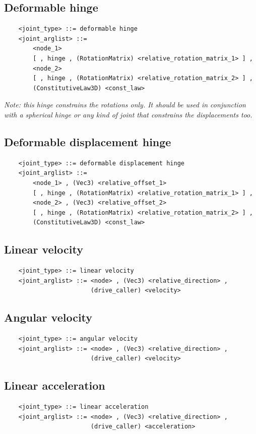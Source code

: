 \subsection{Deformable hinge}
\begin{verbatim}
    <joint_type> ::= deformable hinge
    <joint_arglist> ::= 
        <node_1>
        [ , hinge , (RotationMatrix) <relative_rotation_matrix_1> ] ,
        <node_2> 
        [ , hinge , (RotationMatrix) <relative_rotation_matrix_2> ] ,
        (ConstitutiveLaw3D) <const_law>
\end{verbatim}
{\em 
    Note: this hinge constrains the rotations only.
    It should be used in conjunction with a spherical hinge or any kind of
    joint that constrains the displacements too.
}

\subsection{Deformable displacement hinge}
\begin{verbatim}
    <joint_type> ::= deformable displacement hinge
    <joint_arglist> ::= 
        <node_1> , (Vec3) <relative_offset_1>
        [ , hinge , (RotationMatrix) <relative_rotation_matrix_1> ] ,
        <node_2> , (Vec3) <relative_offset_2>
        [ , hinge , (RotationMatrix) <relative_rotation_matrix_2> ] ,
        (ConstitutiveLaw3D) <const_law>
\end{verbatim}

\subsection{Linear velocity}
\begin{verbatim}
    <joint_type> ::= linear velocity
    <joint_arglist> ::= <node> , (Vec3) <relative_direction> , 
                        (drive_caller) <velocity>
\end{verbatim}

\subsection{Angular velocity}
\begin{verbatim}
    <joint_type> ::= angular velocity
    <joint_arglist> ::= <node> , (Vec3) <relative_direction> , 
                        (drive_caller) <velocity>
\end{verbatim}

\subsection{Linear acceleration}
\begin{verbatim}
    <joint_type> ::= linear acceleration
    <joint_arglist> ::= <node> , (Vec3) <relative_direction> , 
                        (drive_caller) <acceleration>
\end{verbatim}

